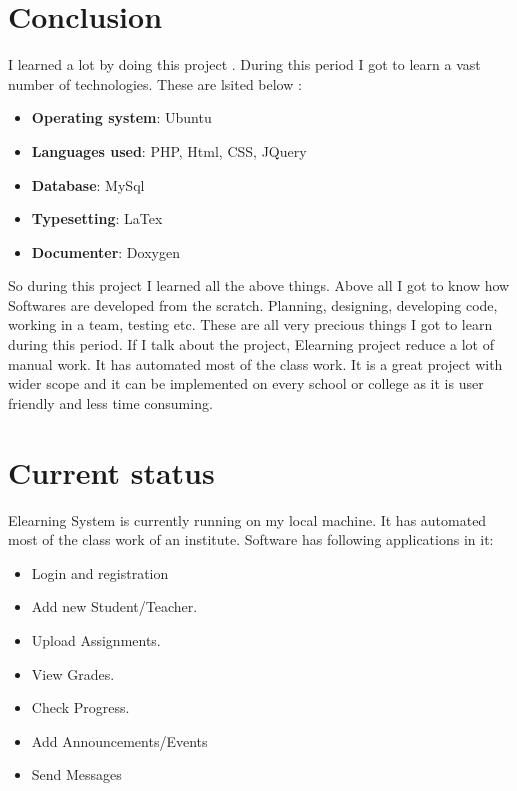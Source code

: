 \section{Conclusion}
I learned a lot by doing this project . During this period I got to learn a vast 
number of technologies. These are lsited below :
\begin{itemize}
\item {\bf{Operating system}}: Ubuntu
\item {\bf{Languages used}}: PHP, Html, CSS, JQuery
\item {\bf{Database}}: MySql
\item {\bf{Typesetting}}: LaTex
\item {\bf{Documenter}}: Doxygen
\end{itemize}
So during this project I learned all the above things. Above all I got to know 
how Softwares are developed from the scratch. Planning, designing, developing code, 
working in a team, testing etc. These are all very precious things I got to learn 
during this period. If I talk about the project, Elearning project reduce a lot of 
manual work. It has automated most of the class work. It is a great project with wider scope and it can be implemented on every school or college as it is user friendly and less time consuming.
\section{Current status}
Elearning System is currently running on my local machine. It has 
automated most of the class work of an institute.
Software has following applications in it:
\begin{itemize}
\item Login and registration
\item Add new Student/Teacher.
\item Upload Assignments.
\item View Grades.
\item Check Progress.
\item Add Announcements/Events
\item Send Messages
\end{itemize}
 
